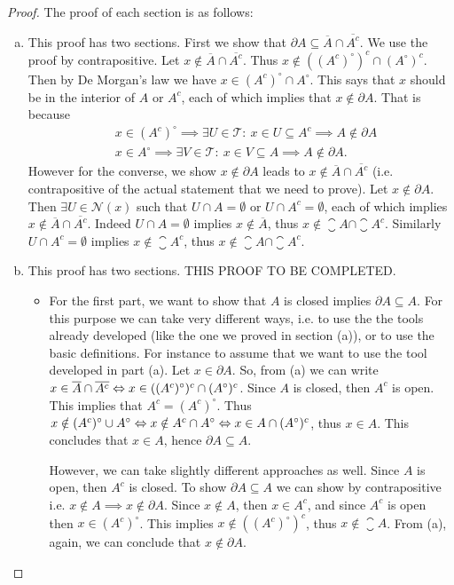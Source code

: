 \begin{proof}
	The proof of each section is as follows:
	\begin{enumerate}[(a)]
		\item This proof has two sections. First we show that $\partial A \subseteq \overline{A} \cap \overline{A^c}$. We use the proof by contrapositive. Let $x\notin \overline{A} \cap \overline{A^c}$. Thus $x\notin ((A^c)^\circ)^c \cap (A^\circ)^c$. Then by De Morgan's law we have $x \in (A^c)^\circ \cap A^\circ$. This says that $x$ should be in the interior of $A$ or $A^c$, each of which implies that $x \notin \partial A$. That is because
		\begin{align*}
			& x \in (A^c)^\circ \implies \exists U \in \mathcal{T}:\ x\in U \subseteq A^c \implies A \notin \partial A\\
			& x \in A^\circ \implies \exists V \in \mathcal{T}:\ x\in V \subseteq A \implies A \notin \partial A.
		\end{align*}
		However for the converse, we show $x \notin \partial A$ leads to $x \notin \overline{A} \cap \overline{A^c}$ (i.e. contrapositive of the actual statement that we need to prove). Let $x \notin \partial A$. Then $\exists U \in \mathcal{N}(x)$ such that $U \cap A = \emptyset$ or $U \cap A^c = \emptyset$, each of which implies $x \notin \overline{A} \cap \overline{A^c}$. Indeed $U \cap A = \emptyset$ implies $x \notin \overline{A}$, thus $x \notin \closure{A} \cap \closure{A^c}$. Similarly $U \cap A^c = \emptyset$ implies $x \notin \closure{A^c}$, thus $x \notin \closure{A} \cap \closure{A^c}$.
		
		\item This proof has two sections. THIS PROOF TO BE COMPLETED. 
		\begin{itemize}
			\item For the first part, we want to show that $A$ is closed implies $\partial A \subseteq A$. For this purpose we can take very different ways, i.e. to use the the tools already developed (like the one we proved in section (a)), or to use the basic definitions. For instance to assume that we want to use the tool developed in part (a). Let $x \in \partial A$. So, from (a) we can write $x \in \overline{A}  \cap \overline{A^c} \Leftrightarrow x \in ((A^c)^\circ)^c \cap (A^\circ)^c$. Since $A$ is closed, then $A^c$ is open. This implies that $A^c = (A^c)^\circ$. Thus $x \notin (A^c)^\circ \cup A^\circ \Leftrightarrow  x \notin A^c \cap A^\circ \Leftrightarrow x \in A \cap (A^\circ)^c$, thus $x \in A$. This concludes that $x \in A$, hence $\partial A \subseteq A.$
			
			However, we can take slightly  different approaches as well. Since $A$ is open, then $A^c$ is closed. To show $\partial A \subseteq A$ we can show by contrapositive i.e. $x\notin A \implies x \notin \partial A$. Since $x\notin A$, then $x \in A^c$, and since $A^c$ is open then $x \in (A^c)^\circ$. This implies $x \notin ((A^c)^\circ)^c$, thus $x \notin \closure{A}$. From (a), again, we can conclude that $x \notin \partial A$.
		\end{itemize}
		
	\end{enumerate}
\end{proof}



